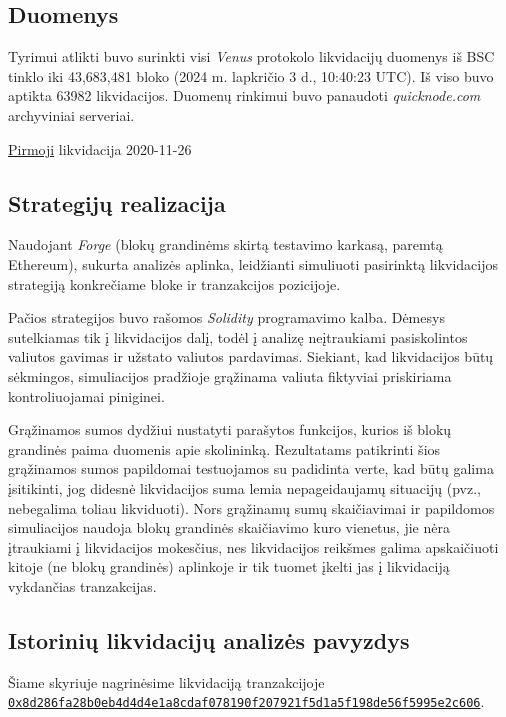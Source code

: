 \documentclass[]{VUMIFTemplateClass}
\begin{document}
\subsection{Duomenys}

Tyrimui atlikti buvo surinkti visi \textit{Venus} protokolo likvidacijų duomenys iš BSC tinklo iki 43,683,481 bloko (2024 m. lapkričio 3 d., 10:40:23 UTC). Iš viso buvo aptikta 63982 likvidacijos. Duomenų rinkimui buvo panaudoti \textit{quicknode.com} archyviniai serveriai.

\href{https://bscscan.com/tx/0x2434f5aee00e1135c66fb42203d506351ed2b6629e01af5daee37f652e4d67b8}{Pirmoji}
likvidacija 2020-11-26

\subsection{Strategijų realizacija}

Naudojant \textit{Forge} (blokų grandinėms skirtą testavimo karkasą, paremtą Ethereum), sukurta analizės aplinka, leidžianti simuliuoti pasirinktą likvidacijos strategiją konkrečiame bloke ir tranzakcijos pozicijoje.

Pačios strategijos buvo rašomos \textit{Solidity} programavimo kalba. Dėmesys sutelkiamas tik į likvidacijos dalį, todėl į analizę neįtraukiami pasiskolintos valiutos gavimas ir užstato valiutos pardavimas. Siekiant, kad likvidacijos būtų sėkmingos, simuliacijos pradžioje grąžinama valiuta fiktyviai priskiriama kontroliuojamai piniginei.

Grąžinamos sumos dydžiui nustatyti parašytos funkcijos, kurios iš blokų grandinės paima duomenis apie skolininką. Rezultatams patikrinti šios grąžinamos sumos papildomai testuojamos su padidinta verte, kad būtų galima įsitikinti, jog didesnė likvidacijos suma lemia nepageidaujamų situacijų (pvz., nebegalima toliau likviduoti). Nors grąžinamų sumų skaičiavimai ir papildomos simuliacijos naudoja blokų grandinės skaičiavimo kuro vienetus, jie nėra įtraukiami į likvidacijos mokesčius, nes likvidacijos reikšmes galima apskaičiuoti kitoje (ne blokų grandinės)  aplinkoje ir tik tuomet įkelti jas į likvidaciją vykdančias tranzakcijas.

\subsection{Istorinių likvidacijų analizės pavyzdys}
\label{sec:istoriniu_likvidaciju_analizes_pavyzdys}

\small
Šiame skyriuje nagrinėsime likvidaciją tranzakcijoje \\\href{https://app.blocksec.com/explorer/tx/bsc/0x8d286fa28b0eb4d4d4e1a8cdaf078190f207921f5d1a5f198de56f5995e2c606}{\texttt{0x8d286fa28b0eb4d4d4e1a8cdaf078190f207921f5d1a5f198de56f5995e2c606}}.
\end{document}
